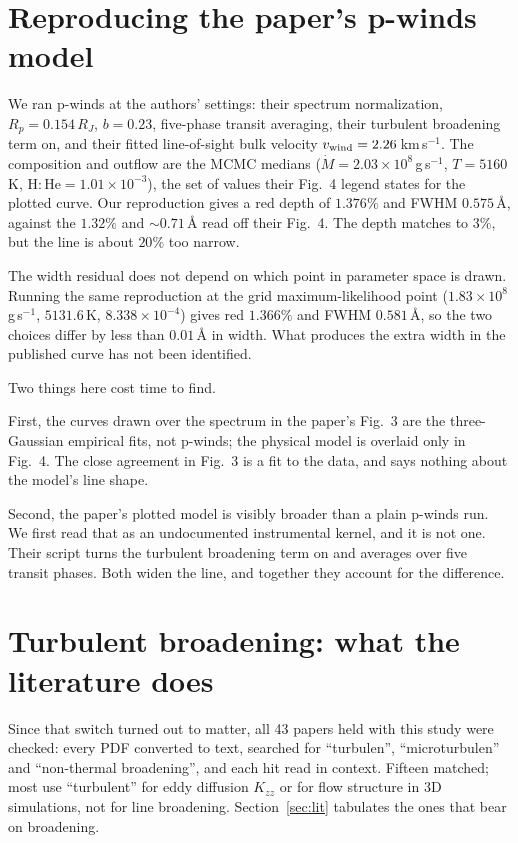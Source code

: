\documentclass[english,a4paper]{my_memo}
\begin{document}
\section{Reproducing the paper's p-winds model}

We ran p-winds at the authors' settings: their spectrum normalization,
$R_p = 0.154\,R_J$, $b = 0.23$, five-phase transit averaging, their
turbulent broadening term on, and their fitted line-of-sight bulk velocity
$v_{\rm wind} = 2.26$\,km\,s$^{-1}$. The composition and outflow are the MCMC
medians ($\dot M = 2.03\times10^{8}$\,g\,s$^{-1}$, $T = 5160$\,K,
$\mathrm{H\!:\!He} = 1.01\times10^{-3}$), the set of values their Fig.~4
legend states for the plotted curve. Our reproduction gives a red depth of
$1.376\%$ and FWHM $0.575$\,\AA{}, against the $1.32\%$ and
$\sim 0.71$\,\AA{} read off their Fig.~4. The depth matches to $3\%$, but the
line is about $20\%$ too narrow.

The width residual does not depend on which point in parameter space is
drawn. Running the same reproduction at the grid maximum-likelihood point
($1.83\times10^{8}$\,g\,s$^{-1}$, $5131.6$\,K, $8.338\times10^{-4}$) gives
red $1.366\%$ and FWHM $0.581$\,\AA{}, so the two choices differ by less than
$0.01$\,\AA{} in width. What produces the extra width in the published curve
has not been identified.

Two things here cost time to find.

First, the curves drawn over the spectrum in the paper's Fig.~3 are the
three-Gaussian empirical fits, not p-winds; the physical model is overlaid
only in Fig.~4. The close agreement in Fig.~3 is a fit to the data, and says
nothing about the model's line shape.

Second, the paper's plotted model is visibly broader than a plain p-winds
run. We first read that as an undocumented instrumental kernel, and it is not
one. Their script turns the turbulent broadening term on and averages over
five transit phases. Both widen the line, and together they account for the
difference.

\section{Turbulent broadening: what the literature does}

Since that switch turned out to matter, all 43 papers held with this study
were checked: every PDF converted to text, searched for ``turbulen'',
``microturbulen'' and ``non-thermal broadening'', and each hit read in
context. Fifteen matched; most use ``turbulent'' for eddy diffusion $K_{zz}$
or for flow structure in 3D simulations, not for line broadening.
Section~\ref{sec:lit} tabulates the ones that bear on broadening.
\end{document}
